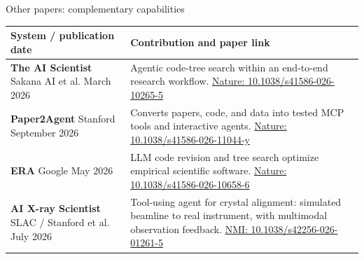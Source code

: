 \setsource{}
\begin{frame}[c,label=md-18]{Other papers: complementary capabilities}
\footnotesize
\renewcommand{\arraystretch}{1.2}
\begin{tabular*}{\textwidth}{@{\extracolsep{\fill}}L{0.27\textwidth}L{0.60\textwidth}@{}}
\toprule
\textbf{System / publication date} & \textbf{Contribution and paper link} \\
\midrule
\textbf{The AI Scientist}\newline
Sakana AI et al. March 2026 &
Agentic code-tree search within an end-to-end research workflow.
\newline\href{https://doi.org/10.1038/s41586-026-10265-5}{\textcolor{structure.fg}{Nature: 10.1038/s41586-026-10265-5}} \\[0.8ex]
\textbf{Paper2Agent}\newline
Stanford September 2026 &
Converts papers, code, and data into tested MCP tools and interactive agents.
\newline\href{https://doi.org/10.1038/s41586-026-11044-y}{\textcolor{structure.fg}{Nature: 10.1038/s41586-026-11044-y}} \\[0.8ex]
\textbf{ERA}\newline
Google May 2026 &
LLM code revision and tree search optimize empirical scientific software.
\newline\href{https://doi.org/10.1038/s41586-026-10658-6}{\textcolor{structure.fg}{Nature: 10.1038/s41586-026-10658-6}} \\[0.8ex]
\textbf{AI X-ray Scientist}\newline
SLAC / Stanford et al. July 2026 &
Tool-using agent for crystal alignment: simulated beamline to real instrument,
with multimodal observation feedback.
\newline\href{https://doi.org/10.1038/s42256-026-01261-5}{\textcolor{structure.fg}{NMI: 10.1038/s42256-026-01261-5}} \\
\bottomrule
\end{tabular*}\par
\end{frame}

